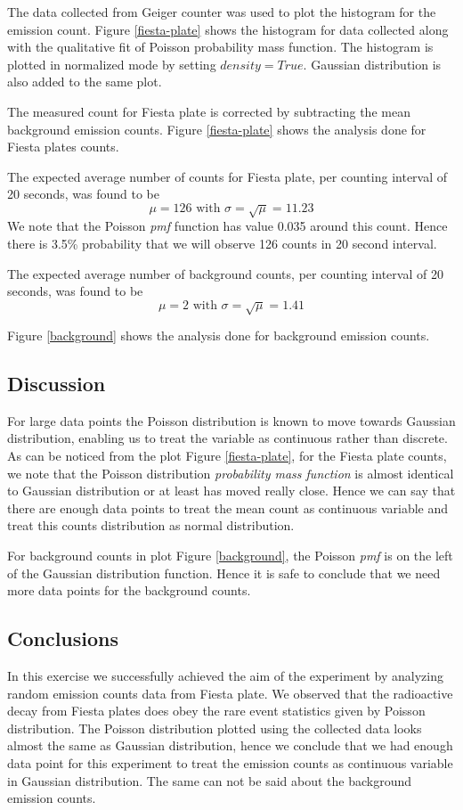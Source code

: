 \documentclass[letterpaper,12pt]{article}
\begin{document}
The data collected from Geiger counter was used to plot the histogram for the emission count. 
Figure \ref{fiesta-plate} shows the histogram for data collected along with the qualitative
fit of Poisson probability mass function. The histogram is plotted in normalized mode by setting $density=True$.
Gaussian distribution is also added to the same plot.

The measured count for Fiesta plate is corrected by subtracting the mean background emission counts. Figure \ref{fiesta-plate} shows the analysis done for Fiesta plates counts.

The expected average number of counts for Fiesta plate, per counting interval of 20 seconds, was found to be
$$\mu=126\text{\ \ \ \ with \ \ \ } \sigma = \sqrt{\mu} = 11.23$$
We note that the Poisson \emph{pmf} function has value 0.035 around this count. Hence there is 3.5\% probability that we will observe 
126 counts in 20 second interval. 

The expected average number of background counts, per counting interval of 20 seconds, was found to be
$$\mu=2\text{\ \ \ \ with \ \ \ } \sigma = \sqrt{\mu} = 1.41$$

Figure \ref{background} shows the analysis done for background emission counts.

\subsection{Discussion}

For large data points the Poisson distribution is known to move towards Gaussian distribution, enabling 
us to treat the variable as continuous rather than discrete. As can be noticed from the plot Figure \ref{fiesta-plate}, 
for the Fiesta plate counts, we note that the Poisson distribution \emph{probability mass function}
is almost identical to Gaussian distribution or at least has moved really close. Hence we can say that there 
are enough data points to treat the mean count as continuous variable and treat this counts distribution as normal distribution. 

For background counts in plot Figure \ref{background}, the Poisson \emph{pmf} is on the left of the Gaussian distribution function. Hence it is safe
to conclude that we need more data points for the background counts.

\subsection{Conclusions}
In this exercise we successfully achieved the aim of the experiment by analyzing random emission counts data
from Fiesta plate. We observed that the radioactive decay from Fiesta plates does obey 
the rare event statistics given by Poisson distribution. The Poisson distribution plotted using the 
collected data looks almost the same as Gaussian distribution, hence we conclude that we had enough 
data point for this experiment to treat the emission counts as continuous variable in  Gaussian distribution. 
The same can not be said about the background emission counts.
\end{document}
